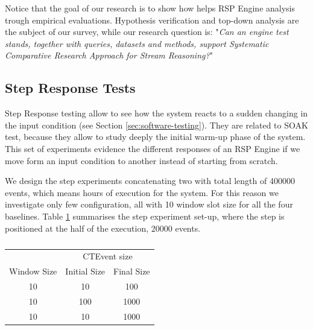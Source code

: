 Notice that the goal of our research is to show how \name helps RSP Engine analysis trough empirical evaluations. Hypothesis verification and top-down analysis are the subject of our survey, while our research question is:  "\textit{Can an engine test stands, together with queries, datasets and methods, support Systematic Comparative Research Approach for Stream Reasoning?}" %

\subsection{Step Response Tests}\label{sec:step-es}

Step Response testing allow to see how the system reacts to a sudden changing in the input condition (see Section \ref{sec:software-testing}). They are related to SOAK test, because they allow to study deeply the initial warm-up phase of the system. This set of experiments evidence the different responses of an RSP Engine if we move form an input condition to another instead of starting from scratch.

We design the step experiments concatenating two with total length of 400000 events, which means hours of execution for the system. For this reason we investigate only few configuration, all with 10  window slot size for all the four baselines. Table \ref{tab:steptests} summarises the step experiment set-up, where the step is positioned at the half of the execution, 20000 events.
\begin{table}[htb]
\centering
 \begin{tabular}{c|c|c}
	  	\hline
	  	&\multicolumn{2}{c}{CTEvent size}  \\
		Window Size & Initial Size & Final Size\\
		\hline
		\hline
		 10 & 10 & 100\\
		  10 & 100 & 1000\\
		 10 & 10 & 1000\\
		
		\hline 
 \end{tabular}
 \caption{}
\label{tab:steptests}
\end{table}

